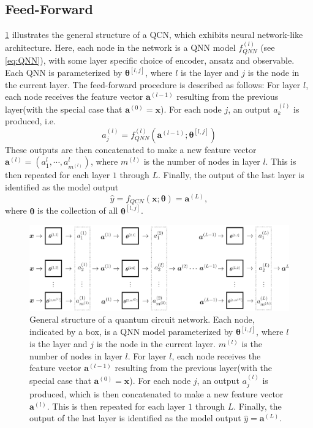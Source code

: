 \subsection{Feed-Forward}\label{sec:FeedForward}
\cref{fig:QCN} illustrates the general structure of a QCN, which exhibits neural network-like architecture. Here, each node in the network is a QNN model $f^{(l)}_{QNN}$ (see \cref{eq:QNN}), with some layer specific choice of encoder, ansatz and observable. Each QNN is parameterized by $\boldsymbol{\theta}^{[l,j]}$, where $l$ is the layer and $j$ is the node in the current layer. The feed-forward procedure is described as follows: 
For layer $l$, each node receives the feature vector $\boldsymbol{a}^{(l-1)}$ resulting from the previous layer(with the special case that $\boldsymbol{a}^{(0)} = \boldsymbol{x}$). For each node $j$, an output $a^{(l)}_k$ is produced, i.e.
\begin{equation}
    a^{(l)}_j = f^{(l)}_{QNN}(\boldsymbol{a}^{(l-1)}; \boldsymbol{\theta}^{[l,j]})
\end{equation}
These outputs are then concatenated to make a new feature vector $\boldsymbol{a}^{(l)} = (a^{l}_1, \cdots, a^{l}_{m^{(l)}})$, where $m^{(l)}$ is the number of nodes in layer $l$. This is then repeated for each layer $1$ through $L$. Finally, the output of the last layer is identified as the model output
\begin{equation}\label{eq:QCN}
    \hat{y} = f_{QCN}(\boldsymbol{x}; \boldsymbol{\theta}) = \boldsymbol{a}^{(L)},
\end{equation}
where $\boldsymbol{\theta}$ is the collection of all $\boldsymbol{\theta}^{[l,j]}$.


\begin{figure}[htp]
    \centering
    \includegraphics[width = 15cm]{latex/figures/QCN.png}
    \caption{General structure of a quantum circuit network. Each node, indicated by a box, is a QNN model parameterized by $\boldsymbol{\theta}^{[l,j]}$, where $l$ is the layer and $j$ is the node in the current layer. $m^{(l)}$ is the number of nodes in layer $l$. For layer $l$, each node receives the feature vector $\boldsymbol{a}^{(l-1)}$ resulting from the previous layer(with the special case that $\boldsymbol{a}^{(0)} = \boldsymbol{x}$). For each node $j$, an output $a^{(l)}_j$ is produced, which is then concatenated to make a new feature vector $\boldsymbol{a}^{(l)}$. This is then repeated for each layer $1$ through $L$. Finally, the output of the last layer is identified as the model output $\hat{y} = \boldsymbol{a}^{(L)}$.}
    \label{fig:QCN}
\end{figure}

